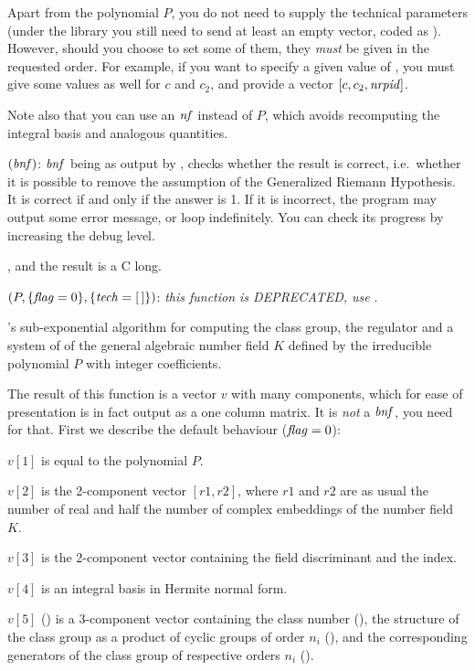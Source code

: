 
Apart from the polynomial $P$, you do not need to supply the technical
parameters (under the library you still need to send at least an empty
vector, coded as ). However, should you choose to set some of them,
they \emph{must} be given in the requested order. For example, if you want to
specify a given value of 
, you must give some values as well for $c$
and $c_2$, and provide a vector $[c,c_2,\hbox{\it nrpid\/}]$.

Note also that you can use an $\hbox{\it nf\/}$ instead of $P$, which avoids
recomputing the integral basis and analogous quantities.

\smallskip
{}$(\hbox{\it bnf\/})$: $\hbox{\it bnf\/}$ being as output by
, checks whether the result is correct, i.e.~whether it is
possible to remove the assumption of the Generalized Riemann
Hypothesis. It is correct if and only if the answer is 1. If it is
incorrect, the program may output some error message, or loop indefinitely.
You can check its progress by increasing the debug level.

, and the result is a C long.

$(P,\{\hbox{\it f\kern0pt lag\/}=0\},\{\hbox{\it tech\/}=[\,]\})$: \emph{this function
is DEPRECATED, use }.

's sub-exponential algorithm for computing the class group, the
regulator and a system of  of the general algebraic
number field $K$ defined by the irreducible polynomial $P$ with integer
coefficients.

The result of this function is a vector $v$ with many components, which for
ease of presentation is in fact output as a one column matrix. It is
\emph{not} a $\hbox{\it bnf\/}$, you need  for that. First we describe
the default behaviour ($\hbox{\it f\kern0pt lag\/}=0$):

 $v[1]$ is equal to the polynomial $P$.

 $v[2]$ is the 2-component vector $[r1,r2]$, where $r1$ and $r2$ are as usual
the number of real and half the number of complex embeddings of the number
field $K$.

 $v[3]$ is the 2-component vector containing the field discriminant and the
index.

 $v[4]$ is an integral basis in Hermite normal form.

 $v[5]$ () is a 3-component vector containing the class number
(), the structure of the class group as a product of cyclic
groups of order $n_i$ (), and the corresponding generators
of the class group of respective orders $n_i$ ().

